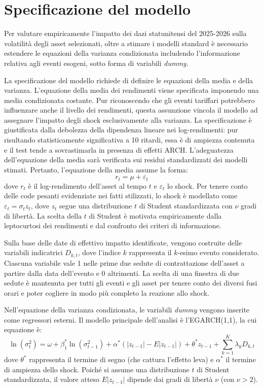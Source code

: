 \section{Specificazione del modello}
\label{sec:specificazione-modello}
Per valutare empiricamente l'impatto dei dazi statunitensi del 2025-2026 sulla volatilità degli asset selezionati, oltre a stimare i modelli standard è necessario estendere 
le equazioni della varianza condizionata includendo l'informazione relativa agli eventi esogeni, sotto forma di variabili \emph{dummy}.

La specificazione del modello richiede di definire le equazioni della media e della varianza. L'equazione della media dei rendimenti viene specificata imponendo una media 
condizionata costante. Pur riconoscendo che gli eventi tariffari potrebbero influenzare anche il livello dei rendimenti, questa assunzione vincola il modello ad assegnare 
l'impatto degli shock esclusivamente alla varianza. La specificazione è giustificata dalla debolezza della dipendenza lineare nei log-rendimenti: pur risultando statisticamente 
significativa a 10 ritardi, essa è di ampiezza contenuta e il test tende a sovrastimarla in presenza di effetti ARCH. L'adeguatezza dell'equazione della media sarà verificata sui residui standardizzati dei modelli stimati.
 Pertanto, l'equazione della media assume la forma:
\[
    r_t = \mu + \varepsilon_t
\]
dove $r_t$ è il log-rendimento dell'asset al tempo $t$ e $\varepsilon_t$ lo shock. Per tenere conto delle code pesanti evidenziate nei fatti stilizzati, lo shock è 
modellato come $\varepsilon_t = \sigma_t z_t$, dove $z_t$ segue una distribuzione $t$ di Student standardizzata con $\nu$ gradi di libertà. La scelta della $t$ di Student 
è motivata empiricamente dalla leptocurtosi dei rendimenti e dal confronto dei criteri di informazione.

Sulla base delle date di effettivo impatto identificate, vengono costruite delle variabili indicatrici $D_{k,t}$, dove l'indice $k$ rappresenta il $k$-esimo evento 
considerato. Ciascuna variabile vale 1 nelle prime due sedute di contrattazione dell'asset a partire dalla data dell'evento e 0 altrimenti. 
La scelta di una finestra di due sedute è mantenuta per tutti gli eventi e gli asset per tenere conto dei diversi fusi orari e poter cogliere in modo più completo la reazione allo shock.

Nell'equazione della varianza condizionata, le variabili \emph{dummy} vengono inserite come regressori esterni. Il modello principale dell'analisi è l'EGARCH(1,1), la cui equazione è:
\[
    \ln(\sigma_t^2) = \omega + \beta_1^* \ln(\sigma_{t-1}^2) + \alpha^* (|z_{t-1}| - E|z_{t-1}|) + \theta^* z_{t-1} + \sum_{k=1}^K \lambda_k D_{k,t}
\]
dove $\theta^*$ rappresenta il termine di segno (che cattura l'effetto leva) e $\alpha^*$ il termine di ampiezza dello shock. Poiché si assume una distribuzione $t$ di 
Student standardizzata, il valore atteso $E|z_{t-1}|$ dipende dai gradi di libertà $\nu$ (con $\nu > 2$).

